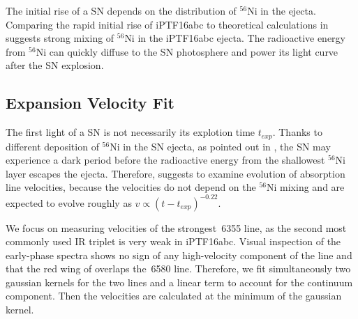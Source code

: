 \documentclass[twocolumn]{aastex61}
\begin{document}
The initial rise of a SN depends on the distribution of $^{56}$Ni
in the ejecta. Comparing the rapid initial rise of iPTF16abc to
theoretical calculations in \citet{2016ApJ...826...96P} suggests
strong mixing of $^{56}$Ni in the iPTF16abc ejecta. The radioactive
energy from $^{56}$Ni can quickly diffuse to the SN photosphere and
power its light curve after the SN explosion. 

\subsection{Expansion Velocity Fit}
\label{sec:early_vel}

The first light of a SN is not necessarily its explotion time
$t_{exp}$.  Thanks to different deposition of $^{56}$Ni in the SN
ejecta, as pointed out in \citet{2014ApJ...784...85P}, the SN may
experience a dark period before the radioactive energy from the
shallowest $^{56}$Ni layer escapes the ejecta. Therefore, 
\citet{2014ApJ...784...85P} suggests to examine evolution of absorption
line velocities, because the velocities do not depend on the $^{56}$Ni
mixing and are expected to evolve roughly as $v\propto(t-t_{exp})^{-0.22}$. 

We focus on measuring velocities of the strongest \,6355
line, as the second most commonly used  IR triplet is very
weak in iPTF16abc. Visual inspection of the early-phase spectra shows
no sign of any high-velocity component of the  line and
that the red wing of  overlaps the \,6580
line. Therefore, we fit simultaneously two gaussian kernels for the
two lines and a linear term to account for the continuum component.
Then the velocities are calculated at the minimum of the 
gaussian kernel.
\end{document}
